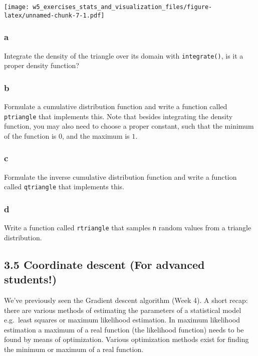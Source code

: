 \documentclass[]{article}
\begin{document}
\texttt{[image: w5\_exercises\_stats\_and\_visualization\_files/figure-latex/unnamed-chunk-7-1.pdf]}

\hypertarget{a-10}{%
\subsubsection{a}\label{a-10}}

Integrate the density of the triangle over its domain with
\texttt{integrate()}, is it a proper density function?

\hypertarget{b-10}{%
\subsubsection{b}\label{b-10}}

Formulate a cumulative distribution function and write a function called
\texttt{ptriangle} that implements this. Note that besides integrating
the density function, you may also need to choose a proper constant,
such that the minimum of the function is \(0\), and the maximum is
\(1\).

\hypertarget{c-10}{%
\subsubsection{c}\label{c-10}}

Formulate the inverse cumulative distribution function and write a
function called \texttt{qtriangle} that implements this.

\hypertarget{d-7}{%
\subsubsection{d}\label{d-7}}

Write a function called \texttt{rtriangle} that samples \texttt{n}
random values from a triangle distribution.

\hypertarget{coordinate-descent-for-advanced-students}{%
\subsection{3.5 Coordinate descent (For advanced
students!)}\label{coordinate-descent-for-advanced-students}}

We've previously seen the Gradient descent algorithm (Week 4). A short
recap: there are various methods of estimating the parameters of a
statistical model e.g.~least squares or maximum likelihood estimation.
In maximum likelihood estimation a maximum of a real function (the
likelihood function) needs to be found by means of optimization. Various
optimization methods exist for finding the minimum or maximum of a real
function.
\end{document}
